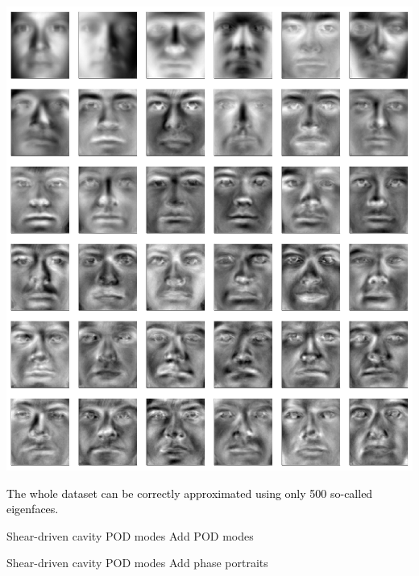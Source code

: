 \documentclass[aspectratio=169, usenames, dvipsnames]{beamer}
\begin{document}
{

\begin{frame}
  \vfill

  \begin{minipage}{.58\textwidth}
    \centering
    \includegraphics[height=.95\textheight]{leading_eigenfaces}
  \end{minipage}%
  \hfill
  \begin{minipage}{.38\textwidth}
    \textcolor{black}{

    The whole dataset can be correctly approximated using only 500 so-called eigenfaces.

    }
  \end{minipage}
  \vfill
\end{frame}

}
\begin{frame}{Shear-driven cavity POD modes}
  Add POD modes
\end{frame}

\begin{frame}{Shear-driven cavity POD modes}
  Add phase portraits
\end{frame}
\end{document}
